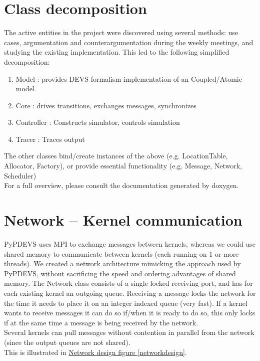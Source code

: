 \documentclass[8pt,a4paper]{report}
\begin{document}
\section{Class decomposition}
The active entities in the project were discovered using several methods: use cases, argumentation and counterargumentation during the weekly meetings, and studying the existing implementation. This led to the following simplified decomposition:
\begin{enumerate}
\item Model : provides DEVS formalism implementation of an Coupled/Atomic model.
\item Core : drives transitions, exchanges messages, synchronizes
\item Controller : Constructs simulator, controls simulation
\item Tracer : Traces output
\end{enumerate}
The other classes bind/create instances of the above (e.g. LocationTable, Allocator, Factory), or provide essential functionality (e.g. Message, Network, Scheduler)\\
For a full overview, please consult the documentation generated by doxygen.

\section{Network -- Kernel communication}
PyPDEVS uses MPI to exchange messages between kernels, whereas we could use shared memory to communicate between kernels (each running on 1 or more threads). We created a network architecture mimicking the approach used by PyPDEVS, without sacrificing the speed and ordering advantages of shared memory. The Network class consists of a single locked receiving port, and has for each existing kernel an outgoing queue. Receiving a message locks the network for the time it needs to place it on an integer indexed queue (very fast). If a kernel wants to receive messages it can do so if/when it is ready to do so, this only locks if at the same time a message is being received by the network.\\ Several kernels can pull messages without contention in parallel from the network (since the output queues are not shared). \\This is illustrated in \hyperref[networkdesign]{Network design figure \ref*{networkdesign}}.
\end{document}
